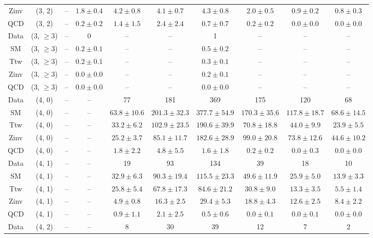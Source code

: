 \begin{table}[h!]
{\begin{tabular}{cccccccccc}
	Zinv & (3, 2) & -- & $1.8\pm 0.4$ & $4.2\pm 0.8$ & $4.1\pm 0.7$ & $4.3\pm 0.8$ & $2.0\pm 0.5$ & $0.9\pm 0.2$ & $0.8\pm 0.3$ \\[0.5ex] 
	QCD & (3, 2) & -- & $0.2\pm 0.2$ & $1.4\pm 1.5$ & $2.4\pm 2.4$ & $0.7\pm 0.7$ & $0.2\pm 0.2$ & $0.0\pm 0.0$ & $0.0\pm 0.0$ \\[0.5ex] 
	Data & (3, $\ge3$) & -- & 0 & -- & -- & 1 & -- & -- & -- \\[0.5ex] 
	SM & (3, $\ge3$) & -- & $0.2\pm 0.1$ & -- & -- & $0.5\pm 0.2$ & -- & -- & -- \\[0.5ex] 
	Ttw & (3, $\ge3$) & -- & $0.2\pm 0.1$ & -- & -- & $0.3\pm 0.1$ & -- & -- & -- \\[0.5ex] 
	Zinv & (3, $\ge3$) & -- & $0.0\pm 0.0$ & -- & -- & $0.2\pm 0.1$ & -- & -- & -- \\[0.5ex] 
	QCD & (3, $\ge3$) & -- & $0.0\pm 0.0$ & -- & -- & $0.0\pm 0.0$ & -- & -- & -- \\[0.5ex] 
	Data & (4, 0) & -- & -- & 77 & 181 & 369 & 175 & 120 & 68 \\[0.5ex] 
	SM & (4, 0) & -- & -- & $63.8\pm 10.6$ & $201.3\pm 32.3$ & $377.7\pm 54.9$ & $170.3\pm 35.6$ & $117.8\pm 18.7$ & $68.6\pm 14.5$ \\[0.5ex] 
	Ttw & (4, 0) & -- & -- & $33.2\pm 6.2$ & $102.9\pm 23.5$ & $190.6\pm 39.9$ & $70.8\pm 18.8$ & $44.0\pm 9.9$ & $23.9\pm 5.5$ \\[0.5ex] 
	Zinv & (4, 0) & -- & -- & $25.2\pm 3.7$ & $85.1\pm 11.7$ & $182.6\pm 28.9$ & $99.0\pm 20.8$ & $73.8\pm 12.6$ & $44.6\pm 10.2$ \\[0.5ex] 
	QCD & (4, 0) & -- & -- & $1.8\pm 2.2$ & $4.8\pm 5.5$ & $1.6\pm 1.8$ & $0.2\pm 0.2$ & $0.0\pm 0.3$ & $0.0\pm 0.0$ \\[0.5ex] 
	Data & (4, 1) & -- & -- & 19 & 93 & 134 & 39 & 18 & 10 \\[0.5ex] 
	SM & (4, 1) & -- & -- & $32.9\pm 6.3$ & $90.3\pm 19.4$ & $115.5\pm 23.3$ & $49.6\pm 11.9$ & $25.9\pm 5.0$ & $13.9\pm 3.3$ \\[0.5ex] 
	Ttw & (4, 1) & -- & -- & $25.8\pm 5.4$ & $67.8\pm 17.3$ & $84.6\pm 21.2$ & $30.8\pm 9.0$ & $13.3\pm 3.5$ & $5.5\pm 1.4$ \\[0.5ex] 
	Zinv & (4, 1) & -- & -- & $4.9\pm 0.8$ & $16.3\pm 2.5$ & $29.4\pm 5.3$ & $18.8\pm 4.3$ & $12.6\pm 2.5$ & $8.4\pm 2.2$ \\[0.5ex] 
	QCD & (4, 1) & -- & -- & $0.9\pm 1.1$ & $2.1\pm 2.5$ & $0.5\pm 0.6$ & $0.0\pm 0.1$ & $0.0\pm 0.1$ & $0.0\pm 0.0$ \\[0.5ex] 
	Data & (4, 2) & -- & -- & 8 & 30 & 39 & 12 & 7 & 2 \\[0.5ex] 

\end{tabular}}
\end{table}
